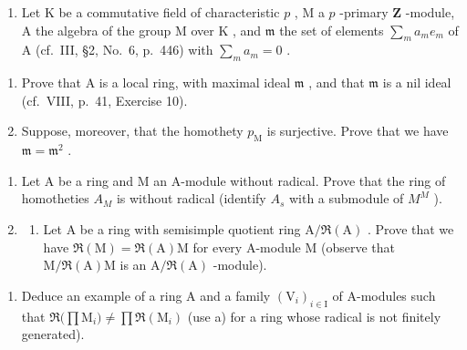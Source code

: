 
\begin{enumerate}
\def\labelenumi{\arabic{enumi})}
\tightlist
\item
  Let \(\mathrm{K}\) be a commutative field of characteristic \(p\) , \(\mathrm{M}\) a \(p\) -primary \(\mathbf{Z}\) -module, \(\mathrm{A}\) the algebra of the group \(\mathrm{M}\) over \(\mathrm{K}\) , and \(\mathfrak{m}\) the set of elements \(\sum_{m} a_{m} e_{m}\) of \(\mathrm{A}\) (cf.~III, §2, No.~6, p.~446) with \(\sum_{m} a_{m} = 0\) .
\end{enumerate}

\begin{enumerate}
\def\labelenumi{\alph{enumi})}
\item
  Prove that A is a local ring, with maximal ideal \(\mathfrak{m}\) , and that \(\mathfrak{m}\) is a nil ideal (cf.~VIII, p.~41, Exercise 10).
\item
  Suppose, moreover, that the homothety \(p_{\mathrm{M}}\) is surjective. Prove that we have \(\mathfrak{m} = \mathfrak{m}^2\) .
\end{enumerate}

\begin{enumerate}
\def\labelenumi{\arabic{enumi})}
\setcounter{enumi}{1}
\item
  Let A be a ring and M an A-module without radical. Prove that the ring of homotheties \(A_{M}\) is without radical (identify \(A_{s}\) with a submodule of \(M^{M}\) ).
\item
  \begin{enumerate}
  \def\labelenumii{\alph{enumii})}
  \tightlist
  \item
    Let A be a ring with semisimple quotient ring \(\mathrm{A} / \Re (\mathrm{A})\) . Prove that we have \(\Re (\mathrm{M}) = \Re (\mathrm{A})\mathrm{M}\) for every A-module M (observe that \(\mathrm{M} / \Re (\mathrm{A})\mathrm{M}\) is an \(\mathrm{A} / \Re (\mathrm{A})\) -module).
  \end{enumerate}
\end{enumerate}

\begin{enumerate}
\def\labelenumi{\alph{enumi})}
\setcounter{enumi}{1}
\tightlist
\item
  Deduce an example of a ring A and a family \((\mathrm{V}_{i})_{i\in\mathrm{I}}\) of A-modules such that \(\Re\big(\prod\mathrm{M}_{i}\big)\neq\prod\Re(\mathrm{M}_{i})\) (use a) for a ring whose radical is not finitely generated).
\end{enumerate}

